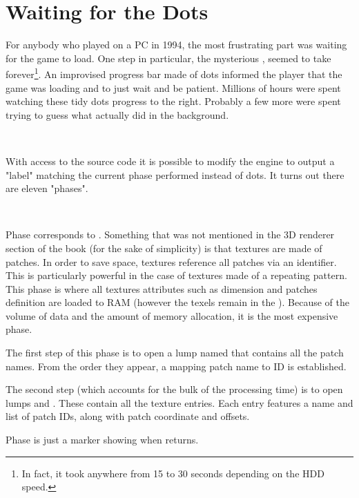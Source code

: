 \section{Waiting for the Dots}
\label{dots_explained}
For anybody who played \doom{} on a PC in 1994, the most frustrating part was waiting for the game to load. One step in particular, the mysterious , seemed to take forever\footnote{In fact, it took anywhere from 15 to 30 seconds depending on the HDD speed.}. An improvised progress bar made of dots informed the player that the game was loading and to just wait and be patient. Millions of hours were spent watching these tidy dots progress to the right. Probably a few more were spent trying to guess what  actually did in the background.\\
\par
{}\\
\par
With access to the source code it is possible to modify the engine to output a "label" matching the current phase performed instead of dots. It turns out there are eleven "phases".\\
\par
{}\\
\par

Phase  corresponds to . Something that was not mentioned in the 3D renderer section of the book (for the sake of simplicity) is that textures are made of patches. In order to save space, textures reference all patches via an identifier. This is particularly powerful in the case of textures made of a repeating pattern. This phase is where all textures attributes such as dimension and patches definition are loaded to RAM (however the texels remain in the ). Because of the volume of data and the amount of  memory allocation, it is the most expensive phase.\\
\par
The first step of this phase is to open a lump named  that contains all the patch names. From the order they appear, a mapping patch name to ID is established.\\
\par
The second step (which accounts for the bulk of the processing time) is to open lumps  and . These contain all the texture entries. Each entry features a name and list of patch IDs, along with patch coordinate and offsets.\\
\par
Phase  is just a marker showing when  returns.\\
\par

